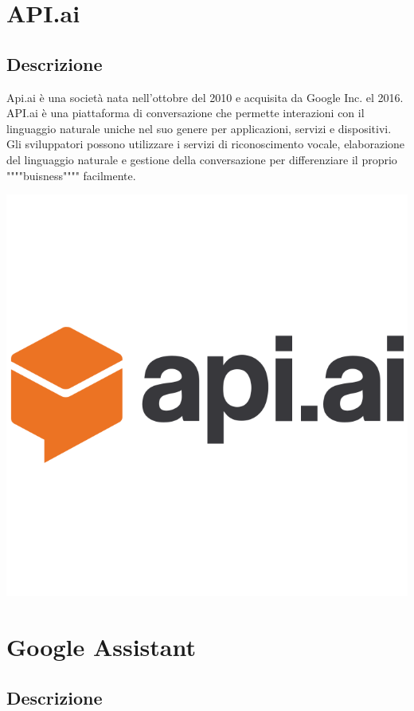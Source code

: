\documentclass[a4paper,titlepage]{article}
\begin{document}
\section{API.ai}
	\subsection{Descrizione}
	\begin{minipage}{0.7\textwidth}\raggedright
		Api.ai è una società nata nell'ottobre del 2010 e acquisita da Google Inc. el 2016.
		API.ai è una piattaforma di conversazione che permette interazioni con il linguaggio naturale uniche nel suo genere per applicazioni, servizi e dispositivi. Gli sviluppatori possono utilizzare i servizi di riconoscimento vocale, elaborazione del linguaggio naturale e gestione della conversazione per differenziare il proprio """"buisness"""" facilmente.
	\end{minipage}
	\hfill
	\noindent\begin{minipage}{0.1\textwidth}
		\includegraphics[scale=0.15]{images/apiai.png}
	\end{minipage}


\section{Google Assistant}
\subsection{Descrizione}
\end{document}
